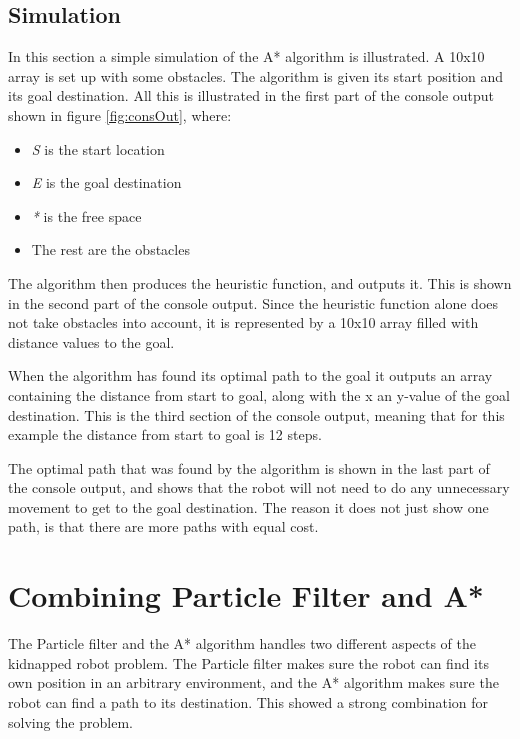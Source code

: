 \subsection{Simulation}
In this section a simple simulation of the A* algorithm is illustrated. A 10x10 array is set up with some obstacles. The algorithm is given its start position and its goal destination. All this is illustrated in the first part of the console output shown in figure \ref{fig:consOut}, where:

\begin{itemize}
	\item \emph{S} is the start location
	\item \emph{E} is the goal destination
	\item \emph{*} is the free space
	\item The rest are the obstacles
\end{itemize}

The algorithm then produces the heuristic function, and outputs it. This is shown in the second part of the console output. Since the heuristic function alone does not take obstacles into account, it is represented by a 10x10 array filled with distance values to the goal. 

When the algorithm has found its optimal path to the goal it outputs an array containing the distance from start to goal, along with the x an y-value of the goal destination. This is the third section of the console output, meaning that for this example the distance from start to goal is 12 steps. 

The optimal path that was found by the algorithm is shown in the last part of the console output, and shows that the robot will not need to do any unnecessary movement to get to the goal destination. The reason it does not just show one path, is that there are more paths with equal cost.  


\section{Combining Particle Filter and A*}

The Particle filter and the A* algorithm handles two different aspects of the kidnapped robot problem. The Particle filter makes sure the robot can find its own position in an arbitrary environment, and the A* algorithm makes sure the robot can find a path to its destination. This showed a strong combination for solving the problem.

